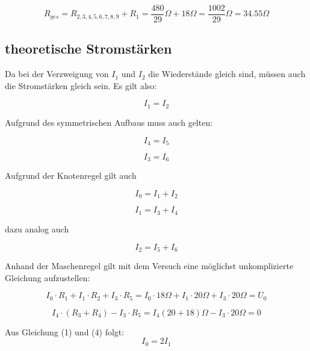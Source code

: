 \documentclass[a4paper,12pt]{article}
\begin{document}
$$R_{ges} = R_{2,3,4,5,6,7,8,9} + R_1 = \frac{480}{29}\Omega + 18\Omega = \frac{1002}{29}\Omega = 34.55\Omega$$

\newpage

\subsection{theoretische Stromstärken}

Da bei der Verzweigung von $I_1$ und $I_2$ die Wiederstände gleich sind, müssen auch die Stromstärken gleich sein. Es gilt also:

\begin{equation}
I_1 = I_2
\end{equation}

Aufgrund des symmetrischen Aufbaus muss auch gelten:

\begin{equation}
I_4=I_5
\end{equation}

\begin{equation}
I_3=I_6
\end{equation}

Aufgrund der Knotenregel gilt auch

\begin{equation}
I_0 = I_1 + I_2
\end{equation}

\begin{equation}
I_1 = I_3 + I_4
\end{equation}

dazu analog auch

\begin{equation}
I_2 = I_5 + I_6
\end{equation}

Anhand der Maschenregel gilt mit dem Versuch eine möglichst unkomplizierte Gleichung aufzustellen:

\begin{equation}
I_0 \cdot R_1 + I_1 \cdot R_2 + I_3 \cdot R_5 = I_0 \cdot 18 \Omega + I_1 \cdot 20 \Omega + I_3 \cdot 20\Omega = U_0
\end{equation}

\begin{equation}
I_4 \cdot (R_3 + R_4) - I_3 \cdot R_5 = I_4 \left(20+18\right)\Omega - I_3 \cdot 20\Omega = 0
\end{equation}

Aus Gleichung (1) und (4) folgt:
\begin{equation}
I_0 = 2I_1
\end{equation}
\end{document}
